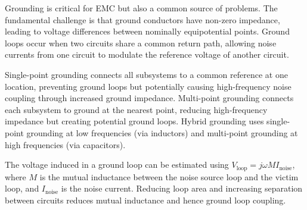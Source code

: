\documentclass[11pt,a4paper]{article}
\begin{document}
Grounding is critical for EMC but also a common source of problems. The fundamental challenge is that ground conductors have non-zero impedance, leading to voltage differences between nominally equipotential points. Ground loops occur when two circuits share a common return path, allowing noise currents from one circuit to modulate the reference voltage of another circuit.

Single-point grounding connects all subsystems to a common reference at one location, preventing ground loops but potentially causing high-frequency noise coupling through increased ground impedance. Multi-point grounding connects each subsystem to ground at the nearest point, reducing high-frequency impedance but creating potential ground loops. Hybrid grounding uses single-point grounding at low frequencies (via inductors) and multi-point grounding at high frequencies (via capacitors).

The voltage induced in a ground loop can be estimated using $V_{\text{loop}} = j \omega M I_{\text{noise}}$, where $M$ is the mutual inductance between the noise source loop and the victim loop, and $I_{\text{noise}}$ is the noise current. Reducing loop area and increasing separation between circuits reduces mutual inductance and hence ground loop coupling.
\end{document}

